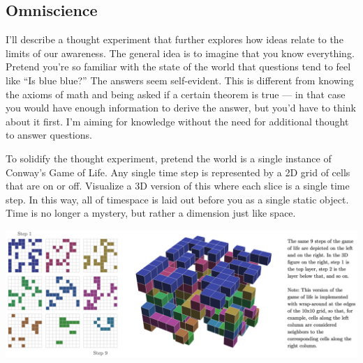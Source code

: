 \documentclass[11pt, oneside]{article}
\theoremstyle{argtstyle}
\begin{document}
%

\subsection{Omniscience}

I'll describe a thought experiment that further explores
how ideas relate to the limits of our awareness.
The general idea is to imagine that you know everything.
Pretend
you're so familiar with the state of the world that questions tend to
feel like ``Is blue blue?'' The answers seem self-evident.
This is
different from knowing the axioms of math and being asked if a certain theorem
is true --- in that case you would have enough information to derive the answer,
but you'd have to think about it first.
I'm aiming for knowledge without the need for additional thought to answer
questions.

To solidify the thought experiment, pretend the world is a single instance of
Conway's Game of Life. Any single time step is represented by a 2D grid of cells
that are on or off.
Visualize a 3D version of this where each slice is a single time step. In this
way, all of timespace is laid out before you as a single static object. Time is
no longer a mystery, but rather a dimension just like space.

\begin{center}
\includegraphics[width=\textwidth]{gameoflife_3d.png}
\end{center}
\end{document}
